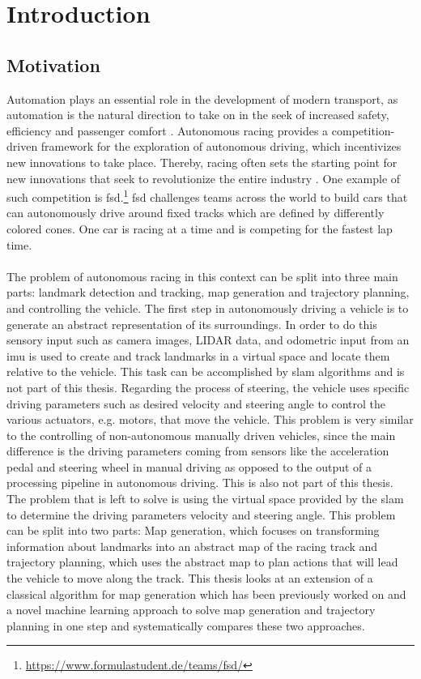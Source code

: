 \graphicspath{{Chapter/Figs/introduction/}}
\chapter{Introduction}

\section{Motivation}
Automation plays an essential role in the development of modern transport, as automation is the natural direction to take on in the seek of increased safety, efficiency and passenger comfort \cite{Lutin2018}. Autonomous racing provides a competition-driven framework for the exploration of autonomous driving, which incentivizes new innovations to take place. Thereby, racing often sets the starting point for new innovations that seek to revolutionize the entire industry \cite{Foxall91}. One example of such competition is \ac{fsd}.\footnote{\url{https://www.formulastudent.de/teams/fsd/}} \ac{fsd} challenges teams across the world to build cars that can autonomously drive around fixed tracks which are defined by differently colored cones. One car is racing at a time and is competing for the fastest lap time.\\
\\The problem of autonomous racing in this context can be split into three main parts: landmark detection and tracking, map generation and trajectory planning, and controlling the vehicle. The first step in autonomously driving a vehicle is to generate an abstract representation of its surroundings. In order to do this sensory input such as camera images, LIDAR data, and odometric input from an \ac{imu} is used to create and track landmarks in a virtual space and locate them relative to the vehicle. This task can be accomplished by \ac{slam} algorithms \cite{Singandhupe2019} and is not part of this thesis. Regarding the process of steering, the vehicle uses specific driving parameters such as desired velocity and steering angle to control the various actuators, e.g. motors, that move the vehicle. This problem is very similar to the controlling of non-autonomous manually driven vehicles, since the main difference is the driving parameters coming from sensors like the acceleration pedal and steering wheel in manual driving as opposed to the output of a processing pipeline in autonomous driving. This is also not part of this thesis. The problem that is left to solve is using the virtual space provided by the \ac{slam} to determine the driving parameters velocity and steering angle. This problem can be split into two parts: Map generation, which focuses on transforming information about landmarks into an abstract map of the racing track and trajectory planning, which uses the abstract map to plan actions that will lead the vehicle to move along the track. This thesis looks at an extension of a classical algorithm for map generation which has been previously worked on and a novel machine learning approach to solve map generation and trajectory planning in one step and systematically compares these two approaches.\\

